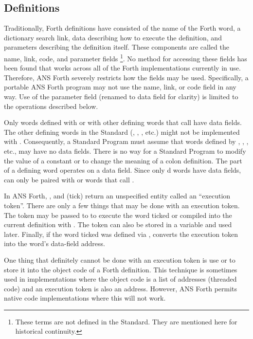 \subsection{Definitions} %

Traditionally, Forth definitions have consisted of the name of the
Forth word, a dictionary search link, data describing how to execute
the definition, and parameters describing the definition itself. These
components are called the name, link, code, and parameter fields%
\footnote{These terms are not defined in the Standard.
They are mentioned here for historical continuity.
}. No method for accessing these fields has been found that works
across all of the Forth implementations currently in use. Therefore,
ANS Forth severely restricts how the fields may be used. Specifically,
a portable ANS Forth program may not use the name, link, or code field
in any way. Use of the parameter field (renamed to data field for
clarity) is limited to the operations described below.

Only words defined with  or with other defining words
that call  have data fields. The other defining words
in the Standard (, , \word{:}, etc.)
might not be implemented with . Consequently, a Standard
Program must assume that words defined by ,
, \word{:}, etc., may have no data fields. There is no
way for a Standard Program to modify the value of a constant or to
change the meaning of a colon definition. The  part of a
defining word operates on a data field. Since only d words
have data fields,  can only be paired with  or
words that call .

In ANS Forth, , \word{[']} and  (tick) return an
unspecified entity called an ``execution token''. There are only a
few things that may be done with an execution token. The token may be
passed to  to execute the word ticked or compiled into
the current definition with . The token can also be
stored in a variable and used later. Finally, if the word ticked was
defined via ,  converts the execution token
into the word's data-field address.

One thing that definitely cannot be done with an execution token is
use \word{!} or \word{,} to store it into the object code of a Forth
definition. This technique is sometimes used in implementations where
the object code is a list of addresses (threaded code) and an execution
token is also an address. However, ANS Forth permits native code
implementations where this will not work.


